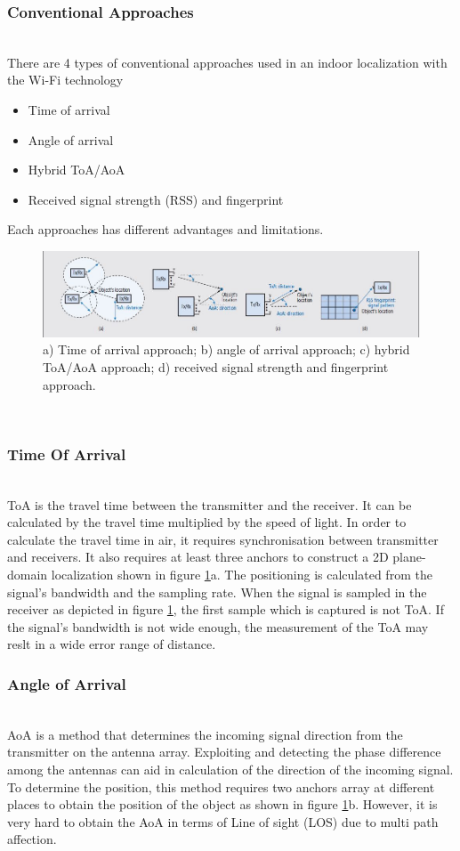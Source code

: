 \documentclass{l4proj}
\begin{document}
\subsubsection{Conventional Approaches}~\\
There are 4 types of conventional approaches used in an indoor localization with the Wi-Fi technology
\begin{itemize}
\item
Time of arrival
\item
Angle of arrival
\item
Hybrid ToA/AoA
\item
Received signal strength (RSS) and fingerprint
\end{itemize}
Each approaches has different advantages and limitations.
\begin{figure}[h]
    \centering
    \includegraphics[width=\textwidth]{images/wifi}
    \caption{a) Time of arrival approach; b) angle of arrival approach; c) hybrid ToA/AoA approach; d) received signal strength and
fingerprint approach.}
    \label{fig:wifi1}
\end{figure}
\\
\subsubsection{Time Of Arrival}~\\
ToA is the travel time between the transmitter and the receiver. It can be calculated by the travel time multiplied by the speed of light. In order to calculate the travel time in air, it requires synchronisation between transmitter and receivers. It also requires at least three anchors to construct a 2D plane-domain localization shown in figure \ref{fig:wifi1}a. The positioning is calculated from the signal's bandwidth and the sampling rate. When the signal is sampled in the receiver as depicted in figure \ref{fig:wifi1}, the first sample which is captured is not ToA. If the signal's bandwidth is not wide enough, the measurement of the ToA may reslt in a wide error range of distance.\cite{toaerror}\\
\subsubsection{Angle of Arrival}~\\
AoA is a method that determines the incoming signal direction from the transmitter on the antenna array. Exploiting and detecting the phase difference among the antennas can aid in calculation of the direction of the incoming signal. To determine the position, this method requires two anchors array at different places to obtain the position of the object as shown in figure \ref{fig:wifi1}b. However, it is very hard to obtain the AoA in terms of Line of sight (LOS) due to multi path affection.\cite{aoaerror}\\
\end{document}
